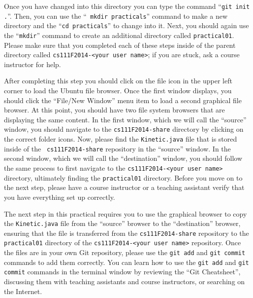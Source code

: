 
Once you have changed into this directory you can type the command ``{\tt git init .}''. Then, you can use the ``{\tt
  mkdir practicals}'' command to make a new directory and the ``{\tt cd practicals}'' to change into it.  Next, you
should again use the ``{\tt mkdir}'' command to create an additional directory called {\tt practical01}.  Please make
sure that you completed each of these steps inside of the parent directory called {\tt cs111F2014-<your user name>}; if
you are stuck, ask a course instructor for help.

After completing this step you should click on the file icon in the upper left corner to load the Ubuntu file browser.
Once the first window displays, you should click the ``File/New Window'' menu item to load a second graphical file
browser. At this point, you should have two file system browsers that are displaying the same content.  In the first
window, which we will call the ``source'' window, you should navigate to the {\tt cs111F2014-share} directory by
clicking on the correct folder icons.  Now, please find the {\tt Kinetic.java} file that is stored inside of the {\tt
  cs111F2014-share} repository in the ``source'' window. In the second window, which we will call the ``destination''
window, you should follow the same process to first navigate to the {\tt cs111F2014-<your user name>} directory,
ultimately finding the {\tt practical01} directory. Before you move on to the next step, please have a course instructor
or a teaching assistant verify that you have everything set up correctly.

The next step in this practical requires you to use the graphical browser to copy the {\tt Kinetic.java} file from the
``source'' browser to the ``destination'' browser, ensuring that the file is transferred from the {\tt cs111F2014-share}
repository to the {\tt practical01} directory of the {\tt cs111F2014-<your user name>} repository.  Once the files are
in your own Git repository, please use the {\tt git add} and {\tt git commit} commands to add them correctly. You can learn how to use the {\tt git add} and {\tt git commit} commands in the terminal window by reviewing the ``Git Cheatsheet'', discussing them with teaching assistants and course instructors, or searching on the Internet.

